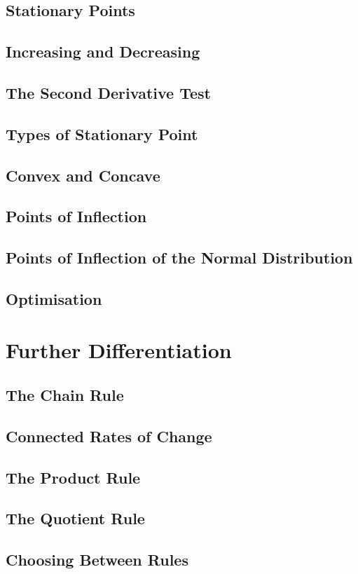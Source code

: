 \documentclass[../alevelmaths.tex]{subfiles}
\begin{document}
\subsection*{Stationary Points}
\subsection*{Increasing and Decreasing}
\subsection*{The Second Derivative Test}
\subsection*{Types of Stationary Point}
\subsection*{Convex and Concave}
\subsection*{Points of Inflection}
\subsection*{Points of Inflection of the Normal Distribution}
\subsection*{Optimisation}
\section{Further Differentiation}
\subsection*{The Chain Rule}
\subsection*{Connected Rates of Change}
\subsection*{The Product Rule}
\subsection*{The Quotient Rule}
\subsection*{Choosing Between Rules}
\end{document}
